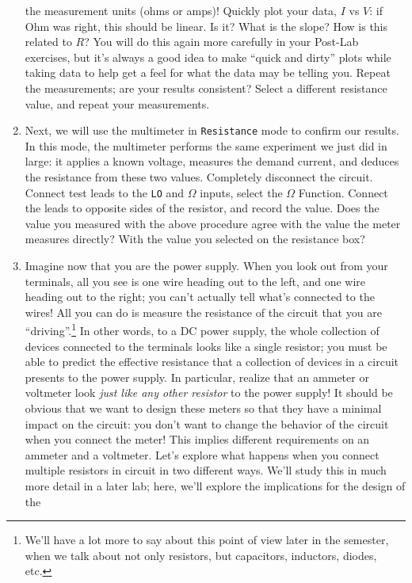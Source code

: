 \documentclass[12pt]{article}
\begin{document}
\begin{enumerate}
  the measurement units (ohms or amps)!  Quickly plot your data, $I$
  vs $V$: if Ohm was right, this should be linear.  Is it?  What is
  the slope?  How is this related to $R$?  You will do this again more
  carefully in your Post-Lab exercises, but it's always a good idea to
  make ``quick and dirty'' plots while taking data to help get a feel
  for what the data may be telling you.  Repeat the measurements; are
  your results consistent?  Select a different resistance value, and
  repeat your measurements.
\item Next, we will use the multimeter in \texttt{Resistance} mode to
  confirm our results.  In this mode, the multimeter performs the same
  experiment we just did in large: it applies a known voltage,
  measures the demand current, and deduces the resistance from these
  two values.  Completely disconnect the circuit.  Connect test leads
  to the \texttt{LO} and \texttt{$\Omega$} inputs, select the
  \texttt{$\Omega$} Function.  Connect the leads to opposite sides of
  the resistor, and record the value.  Does the value you measured
  with the above procedure agree with the value the meter measures
  directly?  With the value you selected on the resistance box?
\item Imagine now that you are the power supply.  When you look out
  from your terminals, all you see is one wire heading out to the
  left, and one wire heading out to the right; you can't actually tell
  what's connected to the wires!  All you can do is measure the
  resistance of the circuit that you are ``driving''.\footnote{We'll
    have a lot more to say about this point of view later in the
    semester, when we talk about not only resistors, but capacitors,
    inductors, diodes, etc.}  In other words, to a DC power supply,
  the whole collection of devices connected to the terminals looks
  like a single resistor; you must be able to predict the effective
  resistance that a collection of devices in a circuit presents to the
  power supply.  In particular, realize that an ammeter or voltmeter
  look \textit{just like any other resistor} to the power supply!  It
  should be obvious that we want to design these meters so that they
  have a minimal impact on the circuit: you don't want to change the
  behavior of the circuit when you connect the meter!  This implies
  different requirements on an ammeter and a voltmeter.  Let's explore
  what happens when you connect multiple resistors in circuit in two
  different ways.  We'll study this in much more detail in a later
  lab; here, we'll explore the implications for the design of the

\end{enumerate}
\end{document}
